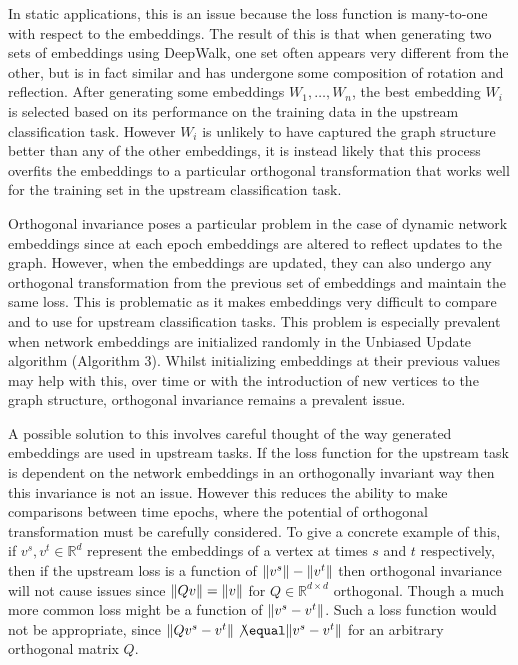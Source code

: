 \documentclass[a4paper]{article}
\begin{document}
In static applications, this is an issue because the loss function is many-to-one with respect to the embeddings. The result of this is that when generating two sets of 
embeddings using DeepWalk, one set often appears very different from the other, but is in fact similar and has undergone some composition of rotation and reflection. After generating 
some embeddings $W_1, \dots, W_n$, the best embedding $W_i$ is selected based on its performance on the training data in the upstream classification task. However $W_i$ is unlikely to have captured the graph structure
better than any of the other embeddings, it is instead likely that this process overfits the embeddings to a particular orthogonal transformation that works well for the training set in the upstream classification task.

Orthogonal invariance poses a particular problem in the case of dynamic network embeddings since at each epoch embeddings are altered to reflect
updates to the graph. However, when the embeddings are updated, they can also undergo any orthogonal transformation from the previous set of embeddings
and maintain the same loss. This is problematic as it makes embeddings very difficult to compare and to use for upstream classification tasks. This problem is especially
prevalent when network embeddings are initialized randomly in the Unbiased Update algorithm (Algorithm 3). Whilst initializing embeddings at their previous values may help with this,
over time or with the introduction of new vertices to the graph structure, orthogonal invariance remains a prevalent issue.

A possible solution to this involves careful thought of the way generated embeddings are used in upstream tasks. If the loss function for the upstream task
is dependent on the network embeddings in an orthogonally invariant way then this invariance is not an issue. However this reduces the ability to
make comparisons between time epochs, where the potential of orthogonal transformation must be carefully considered.
To give a concrete example of this,  if $v^s, v^t \in \mathbb{R}^d$ represent the embeddings of a vertex at times $s$ and $t$ respectively, then
if the upstream loss is a function of $\lVert v^s\rVert-\lVert v^t\rVert$ then orthogonal invariance will not cause issues since $\lVert Qv\rVert = \lVert v\rVert$ for $Q \in \mathbb{R}^{d \times d}$ orthogonal.
Though a much more common loss might be a function of $\lVert v^s - v^t\rVert$. Such a loss function would not be appropriate, since $\norm{Qv^s - v^t} \not\equal \norm{v^s - v^t}$ for an arbitrary
orthogonal matrix $Q$.
\end{document}
